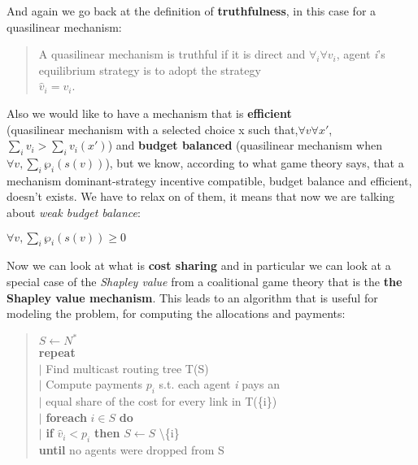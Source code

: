 \documentclass{article}
\begin{document}
{\begin{quote}
\end{quote}
And again we go back at the definition of \textbf{truthfulness}, in this case for a quasilinear mechanism:
\begin{quote}
    A quasilinear mechanism is truthful if it is direct and $\forall _i \forall v_i$, agent \textit{i}'s equilibrium strategy is to adopt the strategy\\ $\hat{v}_i = v_i$.
\end{quote}
Also we would like to have a mechanism that is \textbf{efficient} \\(quasilinear mechanism with a selected choice x such that,\newpage $\forall v \forall x'$, $\displaystyle \sum_{i} v_i > \displaystyle \sum_{i} v_i(x')$) and \textbf{budget balanced} (quasilinear mechanism when $\forall v,\displaystyle\sum_{i} \wp_i (s(v))$), but we know, according to what game theory says, that a mechanism dominant-strategy incentive compatible, budget balance and efficient, doesn't exists. We have to relax on of them, it means that now we are talking about \textit{weak budget balance}:
\begin{center}
    $\forall v, \sum_{i} \wp_i(s(v)) \ge 0$
\end{center}
Now we can look at what is \textbf{cost sharing} and in particular we can look at a special case of the \textit{Shapley value} from a coalitional game theory that is the \textbf{the Shapley value mechanism}. This leads to an algorithm that is useful for modeling the problem, for computing the allocations and payments:
\begin{quote}
    $S \leftarrow N^*$\\
    \textbf{repeat}\\
    $\vert$ Find multicast routing tree T(S)\\
    $\vert$ Compute payments $p_i$ s.t. each agent \textit{i} pays an\\
    $\vert$ equal share of the cost for every link in T(\{i\})\\
    $\vert$ \textbf{foreach} $i \in S$ \textbf{do}\\
    $\vert$ \qquad \textbf{if} $\hat{v}_i < p_i$ \textbf{then} $S \leftarrow S$ \textbackslash \{i\}\\
    \textbf{until} no agents were dropped from S
\end{quote}

}
\end{document}
